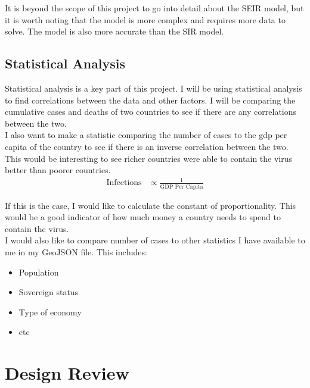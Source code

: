 \documentclass{report}
\begin{document}
It is beyond the scope of this project to go into detail about the SEIR model, but it is worth noting that the model is more complex and requires more data to solve. The model is also more accurate than the SIR model.
\newpage
\section{Statistical Analysis}
Statistical analysis is a key part of this project. I will be using statistical analysis to find correlations between the data and other factors. I will be comparing the cumulative cases and deaths of two countries to see if there are any correlations between the two.\\

I also want to make a statistic comparing the number of cases to the gdp per capita of the country to see if there is an inverse correlation between the two. This would be interesting to see richer countries were able to contain the virus better than poorer countries.
\begin{align}
\text{Infections} &\propto \frac{1}{\text{GDP Per Capita}}
\end{align}

If this is the case, I would like to calculate the constant of proportionality. This would be a good indicator of how much money a country needs to spend to contain the virus. \\

I would also like to compare number of cases to other statistics I have available to me in my GeoJSON file. This includes:
\begin{itemize}
    \item Population
    \item Sovereign status
    \item Type of economy
    \item etc
\end{itemize}

\newpage
\chapter{Design Review}
\end{document}
